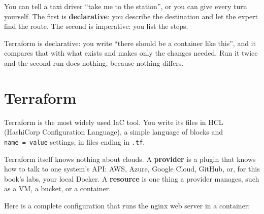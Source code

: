 You can tell a taxi driver ``take me to the station'', or you can give every turn yourself. The first is \textbf{declarative}: you describe the destination and let the expert find the route. The second is imperative: you list the steps.

Terraform is declarative: you write ``there should be a container like this'', and it compares that with what exists and makes only the changes needed. Run it twice and the second run does nothing, because nothing differs.

\section{Terraform}\label{08-infrastructure-as-code:terraform}

Terraform is the most widely used IaC tool. You write its files in HCL (HashiCorp Configuration Language), a simple language of blocks and \texttt{name\ =\ value} settings, in files ending in \texttt{.tf}.

Terraform itself knows nothing about clouds. A \textbf{provider} is a plugin that knows how to talk to one system's API: AWS, Azure, Google Cloud, GitHub, or, for this book's labs, your local Docker. A \textbf{resource} is one thing a provider manages, such as a VM, a bucket, or a container.


Here is a complete configuration that runs the nginx web server in a container:

\begin{codeblock}

\begin{Shaded}
\begin{Highlighting}[]
\NormalTok{    \}}
\NormalTok{  \}}
\NormalTok{\}}


\NormalTok{\}}


\NormalTok{  \}}
\NormalTok{\}}
\end{Highlighting}
\end{Shaded}

\end{codeblock}

